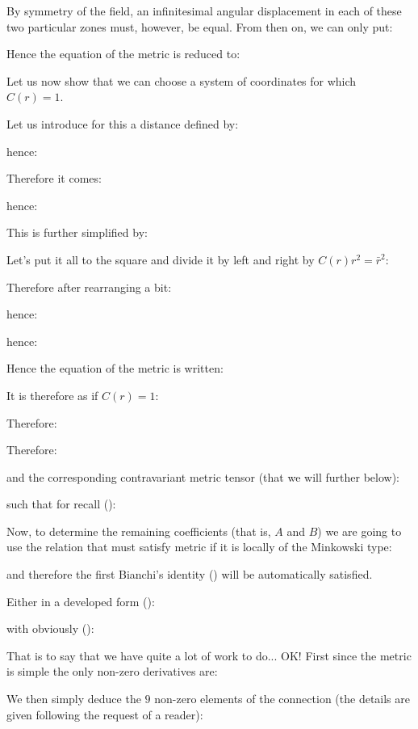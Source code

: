 	By symmetry of the field, an infinitesimal angular displacement in each of these two particular zones must, however, be equal. From then on, we can only put:
	
	Hence the equation of the metric is reduced to:
	
	Let us now show that we can choose a system of coordinates for which $C(r)=1$.

	Let us introduce for this a distance defined by:
	
	hence:
	
	Therefore it comes:
	
	hence:
	
	This is further simplified by:
	
	Let's put it all to the square and divide it by left and right by $C(r)r^2=\bar{r}^2$:
	
	Therefore after rearranging a bit:
	
	hence:
	
	hence:
	
	Hence the equation of the metric is written:
	
	It is therefore as if $C(r)=1$:
	
	Therefore:
	
	Therefore:
	
	and the corresponding contravariant metric tensor (that we will further below):
	
	such that for recall ():
	
	Now, to determine the remaining coefficients (that is, $A$ and $B$) we are going to use the relation that must satisfy metric if it is locally of the Minkowski type:
	
	and therefore the first Bianchi's identity () will be automatically satisfied.

	Either in a developed form ():
	
	with obviously ():
	
	That is to say that we have quite a lot of work to do... OK! First since the metric is simple the only non-zero derivatives are:	
	
	We then simply deduce the $9$ non-zero elements of the connection (the details are given following the request of a reader):
	
	
	
	
	
	
	
